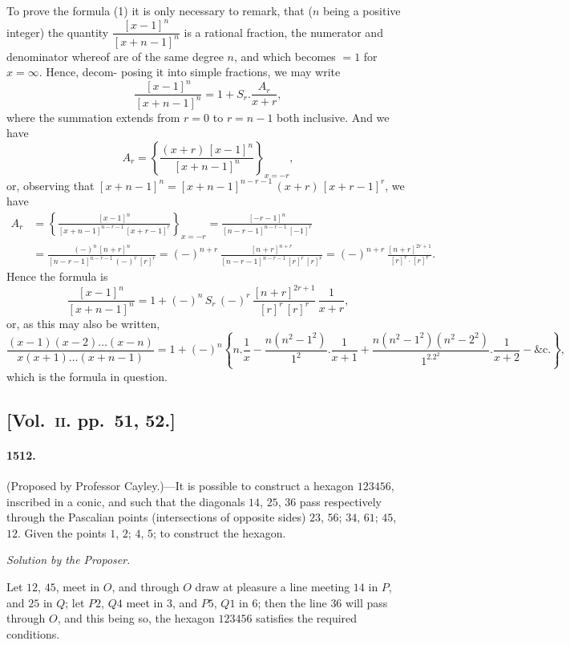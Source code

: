 \documentclass[11pt,a4paper]{article}
\begin{document}
To prove the formula (1) it is only necessary to remark, that ($n$ being a positive
integer) the quantity $\dfrac{[x-1]^n}{[x+n-1]^n}$ is a rational fraction, the numerator and denominator
whereof are of the same degree $n$, and which becomes $=1$ for $x=\infty$. Hence, decom-
\noindent posing it into simple fractions, we may write
\[
\frac{[x-1]^n}{[x+n-1]^n} = 1 + S_r.\frac{A_r}{x+r},
\]
where the summation extends from $r=0$ to $r=n-1$ both inclusive. And we have
\[
A_r = \left\{\frac{(x+r)\,[x-1]^n}{[x+n-1]^n}\right\}_{x=-r},
\]
or, observing that $[x+n-1]^n = [x+n-1]^{n-r-1}\,(x+r)\,[x+r-1]^r$, we have
\begin{align*}
A_r &= \left\{\frac{[x-1]^n}{[x+n-1]^{n-r-1}\,[x+r-1]^r}\right\}_{x=-r} = \frac{[-r-1]^n}{[n-r-1]^{n-r-1}\,[-1]^r}\\
&= \frac{(-)^n\,[n+r]^n}{[n-r-1]^{n-r-1}\,(-)^r\,[r]^r} = (-)^{n+r}\,\frac{[n+r]^{n+r}}{[n-r-1]^{n-r-1}\,[r]^r\,[r]^r} = (-)^{n+r}\,\frac{[n+r]^{2r+1}}{[r]^r\cdot[r]^r}.
\end{align*}
Hence the formula is
\[
\frac{[x-1]^n}{[x+n-1]^n} = 1 + (-)^n\,S_r\,(-)^r\,\frac{[n+r]^{2r+1}}{[r]^r\,[r]^r}\,\frac{1}{x+r},
\]
or, as this may also be written,
\[
\frac{(x-1)(x-2)\ldots(x-n)}{x(x+1)\ldots(x+n-1)} = 1 + (-)^n\left\{n.\frac{1}{x} - \frac{n(n^2-1^2)}{1^2}.\frac{1}{x+1} + \frac{n(n^2-1^2)(n^2-2^2)}{1^2.2^2}.\frac{1}{x+2} - \&\text{c.}\right\},
\]
which is the formula in question.

\subsection*{[Vol.~\textsc{ii}. pp.\ 51, 52.]}

\paragraph*{1512.} (Proposed by Professor Cayley.)---It is possible to construct a hexagon
$123456$, inscribed in a conic, and such that the diagonals $14$, $25$, $36$ pass respectively
through the Pascalian points (intersections of opposite sides) $23$, $56$; $34$, $61$; $45$, $12$.
Given the points $1$, $2$; $4$, $5$; to construct the hexagon.

\begin{center}
\textit{Solution by the Proposer.}
\end{center}

Let $12$, $45$, meet in $O$, and through $O$ draw at pleasure a line meeting $14$ in $P$,
and $25$ in $Q$; let $P2$, $Q4$ meet in $3$, and $P5$, $Q1$ in $6$; then the line $36$ will pass
through $O$, and this being so, the hexagon $123456$ satisfies the required conditions.
\end{document}
